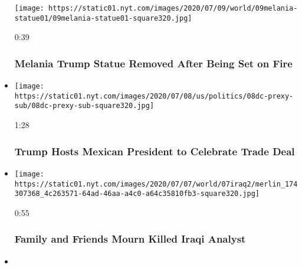 \begin{itemize}
  \texttt{[image: https://static01.nyt.com/images/2020/07/09/world/09melania-statue01/09melania-statue01-square320.jpg]}

  0:39

  \hypertarget{melania-trump-statue-removed-after-being-set-on-fire}{%
  \subsubsection{Melania Trump Statue Removed After Being Set on
  Fire}\label{melania-trump-statue-removed-after-being-set-on-fire}}
\item
  \href{https://www.nytimes.com/video/us/100000007230340/trump-hosts-mexican-president-to-celebrate-trade-deal.html?action=click\&module=video-series-bar\&region=header\&pgtype=Article\&playlistId=video/world}{}

  \texttt{[image: https://static01.nyt.com/images/2020/07/08/us/politics/08dc-prexy-sub/08dc-prexy-sub-square320.jpg]}

  1:28

  \hypertarget{trump-hosts-mexican-president-to-celebrate-trade-deal}{%
  \subsubsection{Trump Hosts Mexican President to Celebrate Trade
  Deal}\label{trump-hosts-mexican-president-to-celebrate-trade-deal}}
\item
  \href{https://www.nytimes.com/video/us/100000007227750/family-and-friends-mourn-killed-iraqi-analyst.html?action=click\&module=video-series-bar\&region=header\&pgtype=Article\&playlistId=video/world}{}

  \texttt{[image: https://static01.nyt.com/images/2020/07/07/world/07iraq2/merlin\_174307368\_4c263571-64ad-46aa-a4c0-a64c35810fb3-square320.jpg]}

  0:55

  \hypertarget{family-and-friends-mourn-killed-iraqi-analyst}{%
  \subsubsection{Family and Friends Mourn Killed Iraqi
  Analyst}\label{family-and-friends-mourn-killed-iraqi-analyst}}
\item
  \href{https://www.nytimes.com/video/world/australia/100000007227099/melbourne-australia-lockdown.html?action=click\&module=video-series-bar\&region=header\&pgtype=Article\&playlistId=video/world}{}


\end{itemize}
